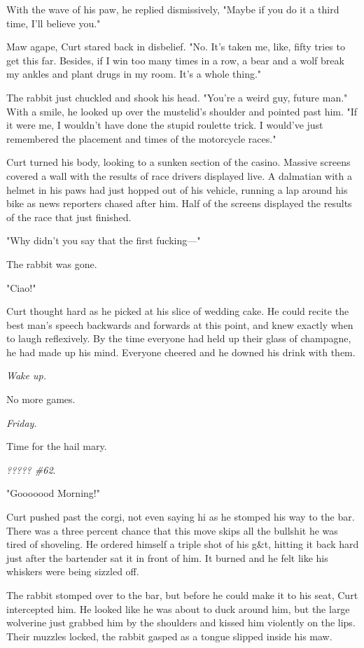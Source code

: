 With the wave of his paw, he replied dismissively, "Maybe if you do it a third time, I'll believe you."

Maw agape, Curt stared back in disbelief. "No. It's taken me, like, fifty tries to get this far. Besides, if I win too many times in a row, a bear and a wolf break my ankles and plant drugs in my room. It's a whole thing."

The rabbit just chuckled and shook his head. "You're a weird guy, future man." With a smile, he looked up over the mustelid's shoulder and pointed past him. "If it were me, I wouldn't have done the stupid roulette trick. I would've just remembered the placement and times of the motorcycle races."

Curt turned his body, looking to a sunken section of the casino. Massive screens covered a wall with the results of race drivers displayed live. A dalmatian with a helmet in his paws had just hopped out of his vehicle, running a lap around his bike as news reporters chased after him. Half of the screens displayed the results of the race that just finished.

"Why didn't you say that the first fucking---"

The rabbit was gone.

"Ciao!"

Curt thought hard as he picked at his slice of wedding cake. He could recite the best man's speech backwards and forwards at this point, and knew exactly when to laugh reflexively. By the time everyone had held up their glass of champagne, he had made up his mind. Everyone cheered and he downed his drink with them.

\emph{Wake up.}

No more games.

\emph{Friday}.

Time for the hail mary.

\emph{????? \#62}.

"Gooooood Morning!"

Curt pushed past the corgi, not even saying hi as he stomped his way to the bar. There was a three percent chance that this move skips all the bullshit he was tired of shoveling. He ordered himself a triple shot of his g\&t, hitting it back hard just after the bartender sat it in front of him. It burned and he felt like his whiskers were being sizzled off.

The rabbit stomped over to the bar, but before he could make it to his seat, Curt intercepted him. He looked like he was about to duck around him, but the large wolverine just grabbed him by the shoulders and kissed him violently on the lips. Their muzzles locked, the rabbit gasped as a tongue slipped inside his maw.

